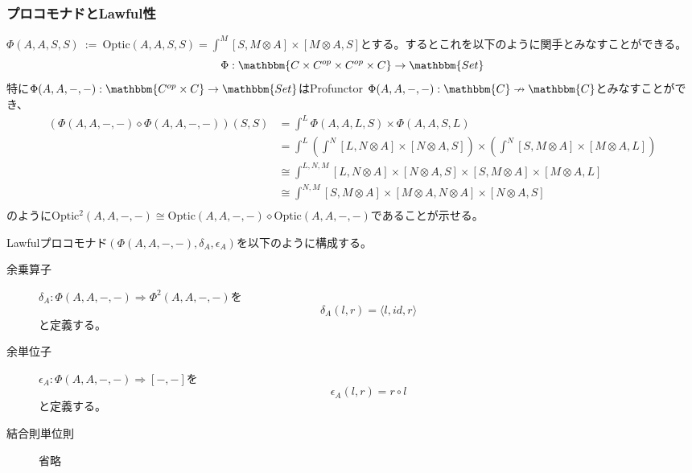 \documentclass[uplatex,dvipdfmx]{beamer}
\newcommand{\cat}[1]{\mathbbm{#1}}
\newcommand{\arrow}{\rightarrow}
\newcommand{\functor}[3]{#1:\cat{#2}\arrow \cat{#3}}
\newcommand{\profunctor}[3]{#1:\cat{#2}\nrightarrow \cat{#3}}
\newcommand{\nat}[3]{#1:#2\Rightarrow #3}
\newcommand{\tuple}[1]{\langle #1\rangle}
\newcommand{\inset}[2]{[#1,#2]}
\begin{document}
  \begin{frame}
    \frametitle{プロコモナドとLawful性}
    $\Phi(A,A,S,S)\ :=\ \mathrm{Optic}(A,A,S,S) = \int^M \inset{S}{M\otimes A}\times \inset{M\otimes A}{S}$とする。するとこれを以下のように関手とみなすことができる。\[\functor{\Phi}{C\times C^{op}\times C^{op}\times C}{Set}\]特に$\functor{\Phi(A,A,-,-)}{C^{op}\times C}{Set}$はProfunctor $\profunctor{\Phi(A,A,-,-)}{C}{C}$とみなすことができ、
    {\tiny\begin{align*}
      (\Phi(A,A,-,-)\diamond\Phi(A,A,-,-))(S,S) &= \int^L \Phi(A,A,L,S)\times \Phi(A,A,S,L)\\
      &= \int^L (\int^N \inset{L}{N\otimes A}\times \inset{N\otimes A}{S})\times (\int^N \inset{S}{M\otimes A}\times \inset{M\otimes A}{L})\\
      &\cong \int^{L,N,M} \inset{L}{N\otimes A}\times \inset{N\otimes A}{S}\times\inset{S}{M\otimes A}\times \inset{M\otimes A}{L}\\
      &\cong \int^{N,M} \inset{S}{M\otimes A}\times \inset{M\otimes A}{N\otimes A}\times \inset{N\otimes A}{S}\\
    \end{align*}}
    のように$\mathrm{Optic^2}(A,A,-,-)\cong\mathrm{Optic}(A,A,-,-)\diamond\mathrm{Optic}(A,A,-,-)$であることが示せる。
  \end{frame}
  \begin{frame}
    \begin{definition}[Lawfulプロコモナド]
      Lawfulプロコモナド$(\Phi(A,A,-,-),\delta_A,\epsilon_A)$を以下のように構成する。
      \begin{description}
        \item[余乗算子] $\nat{\delta_A}{\Phi(A,A,-,-)}{\Phi^2(A,A,-,-)}$を
        \[\delta_A(l,r) = \tuple{l,id,r}\]と定義する。
        \item[余単位子] $\nat{\epsilon_A}{\Phi(A,A,-,-)}{\inset{-}{-}}$を
        \[\epsilon_A(l,r) = r\circ l\]と定義する。
        \item[結合則単位則]省略
      \end{description}
    \end{definition}  
  \end{frame}
\end{document}

